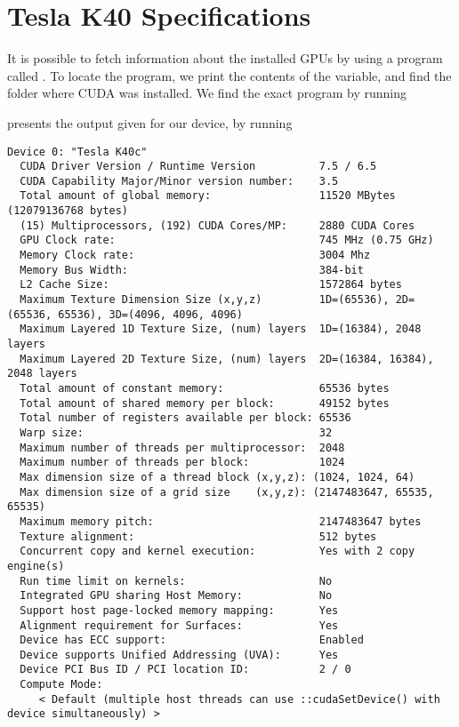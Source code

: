 \chapter{Tesla K40 Specifications}
\label{ap:tesla k40 specifications}

It is possible to fetch information about the installed GPUs by using a program called .
To locate the program, we print the contents of the  variable, and find the folder where CUDA was installed.
We find the exact program by running

\begin{quote}
\end{quote}

 presents the output given for our device, by running

\begin{quote}
\end{quote}

\begin{lstlisting}[language={}, xleftmargin=0.0pt, xrightmargin=0.0pt, numbers=none, caption={Information on the Tesla K40 GPU}, label={lst:tesla k40}]
Device 0: "Tesla K40c"
  CUDA Driver Version / Runtime Version          7.5 / 6.5
  CUDA Capability Major/Minor version number:    3.5
  Total amount of global memory:                 11520 MBytes (12079136768 bytes)
  (15) Multiprocessors, (192) CUDA Cores/MP:     2880 CUDA Cores
  GPU Clock rate:                                745 MHz (0.75 GHz)
  Memory Clock rate:                             3004 Mhz
  Memory Bus Width:                              384-bit
  L2 Cache Size:                                 1572864 bytes
  Maximum Texture Dimension Size (x,y,z)         1D=(65536), 2D=(65536, 65536), 3D=(4096, 4096, 4096)
  Maximum Layered 1D Texture Size, (num) layers  1D=(16384), 2048 layers
  Maximum Layered 2D Texture Size, (num) layers  2D=(16384, 16384), 2048 layers
  Total amount of constant memory:               65536 bytes
  Total amount of shared memory per block:       49152 bytes
  Total number of registers available per block: 65536
  Warp size:                                     32
  Maximum number of threads per multiprocessor:  2048
  Maximum number of threads per block:           1024
  Max dimension size of a thread block (x,y,z): (1024, 1024, 64)
  Max dimension size of a grid size    (x,y,z): (2147483647, 65535, 65535)
  Maximum memory pitch:                          2147483647 bytes
  Texture alignment:                             512 bytes
  Concurrent copy and kernel execution:          Yes with 2 copy engine(s)
  Run time limit on kernels:                     No
  Integrated GPU sharing Host Memory:            No
  Support host page-locked memory mapping:       Yes
  Alignment requirement for Surfaces:            Yes
  Device has ECC support:                        Enabled
  Device supports Unified Addressing (UVA):      Yes
  Device PCI Bus ID / PCI location ID:           2 / 0
  Compute Mode:
     < Default (multiple host threads can use ::cudaSetDevice() with device simultaneously) >
\end{lstlisting}


